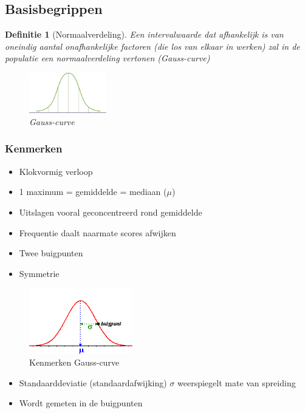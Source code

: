 \documentclass{article}
\newtheorem{theorem}{Definitie}[section]
\begin{document}
\subsection{Basisbegrippen}

\begin{theorem}[Normaalverdeling]
    Een intervalwaarde dat afhankelijk is van oneindig aantal onafhankelijke factoren (die los van elkaar in werken)
    zal in de populatie een normaalverdeling vertonen (Gauss-curve)

    \begin{figure}[H]
        \centering
        \includegraphics[width=0.3\textwidth]{gauss.png}
        \caption{Gauss-curve}
    \end{figure}
\end{theorem}

\subsubsection{Kenmerken}

\begin{itemize}
    \item Klokvormig verloop
    \item 1 maximum = gemiddelde = mediaan ($\mu$)
    \item Uitslagen vooral geconcentreerd rond gemiddelde
    \item Frequentie daalt naarmate scores afwijken
    \item Twee buigpunten
    \item Symmetrie
\end{itemize}

\begin{figure}[H]
    \centering
    \includegraphics[width=0.4\textwidth]{gauss-kenmerken.png}
    \caption{Kenmerken Gauss-curve}
\end{figure}

\begin{itemize}
    \item Standaarddeviatie (standaardafwijking) $\sigma$ weerspiegelt mate van spreiding
    \item Wordt gemeten in de buigpunten
\end{itemize}
\end{document}
